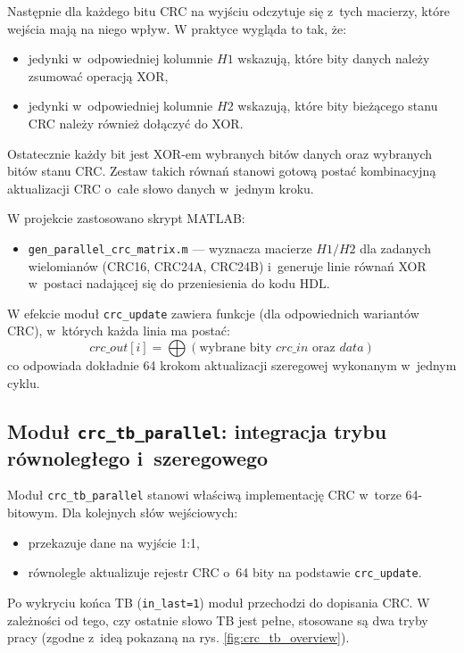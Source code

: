 Następnie dla każdego bitu CRC na wyjściu odczytuje się z~tych macierzy, które wejścia mają na niego wpływ. W praktyce wygląda to tak, że:
\begin{itemize}
  \item jedynki w~odpowiedniej kolumnie $H1$ wskazują, które bity danych należy zsumować operacją XOR,
  \item jedynki w~odpowiedniej kolumnie $H2$ wskazują, które bity bieżącego stanu CRC należy również dołączyć do XOR.
\end{itemize}

Ostatecznie każdy bit jest XOR-em wybranych bitów danych oraz wybranych bitów stanu CRC. Zestaw takich równań stanowi gotową postać kombinacyjną aktualizacji CRC o~całe słowo danych w~jednym kroku.



W projekcie zastosowano skrypt MATLAB:
\begin{itemize}
    \item \texttt{gen\_parallel\_crc\_matrix.m} --- wyznacza macierze $H1/H2$ dla zadanych wielomianów (CRC16, CRC24A, CRC24B) i~generuje linie równań XOR w~postaci nadającej się do przeniesienia do kodu HDL.
\end{itemize}

W efekcie moduł \texttt{crc\_update} zawiera funkcje (dla odpowiednich wariantów CRC), w~których każda linia ma postać:
\[
crc\_out[i] = \bigoplus(\text{wybrane bity } crc\_in \text{ oraz } data)
\]
co odpowiada dokładnie 64 krokom aktualizacji szeregowej wykonanym w~jednym cyklu.


\subsection{Moduł \texttt{crc\_tb\_parallel}: integracja trybu równoległego i~szeregowego}
\label{subsec:crc_tb_parallel}

Moduł \texttt{crc\_tb\_parallel} stanowi właściwą implementację CRC w~torze 64-bitowym. Dla kolejnych słów wejściowych:
\begin{itemize}
    \item przekazuje dane na wyjście 1:1,
    \item równolegle aktualizuje rejestr CRC o~64 bity na podstawie \texttt{crc\_update}.
\end{itemize}

Po wykryciu końca TB (\texttt{in\_last=1}) moduł przechodzi do dopisania CRC. W zależności od tego, czy ostatnie słowo TB jest pełne, stosowane są dwa tryby pracy (zgodne z~ideą pokazaną na rys. \ref{fig:crc_tb_overview}).

